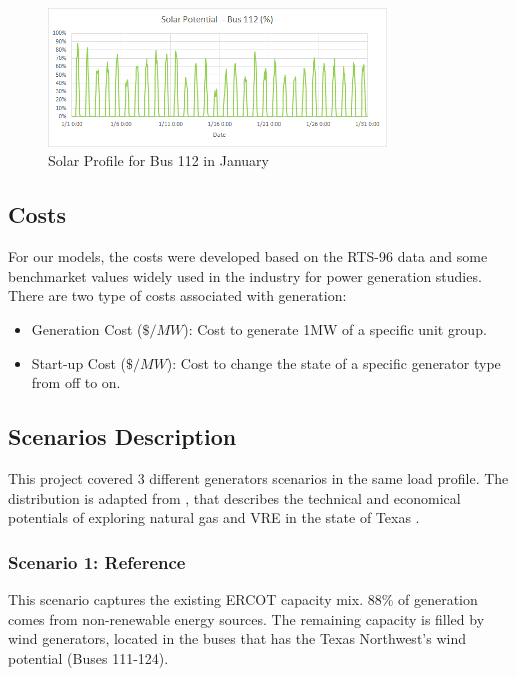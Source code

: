 \documentclass[12pt,LUDisStyle,twosided]{book}
\begin{document}
\begin{figure}[h!] 
	\begin{center}
		\includegraphics[width=0.8\textwidth,keepaspectratio]{solarPotentialBus112.png}
	  	\caption{Solar Profile for Bus 112 in January }
     	\label{fig:solarProfileBus112January}
	\end{center}
\end{figure}


\subsection{Costs}

For our models, the costs were developed based on the RTS-96 data and some benchmarket values widely used in the industry for power generation studies. There are two type of costs associated with generation:

\begin{itemize}
\item Generation Cost ($\$/MW$): Cost to generate 1MW of a specific unit group.
\item Start-up Cost ($\$/MW$): Cost to change the state of a specific generator type from off to on.
\end{itemize}

\subsection{Scenarios Description}

This project covered 3 different generators scenarios in the same load profile. The distribution is adapted from \citeauthor{shavel} \cite{shavel}, that describes the technical and economical potentials of exploring natural gas and VRE in the state of Texas \cite{shavel}. 

\subsubsection{Scenario 1: Reference}

This scenario captures the existing ERCOT capacity mix. 88\% of generation comes from non-renewable energy sources. The remaining capacity is filled by wind generators, located in the buses that has the Texas Northwest's wind potential (Buses 111-124).
\end{document}
